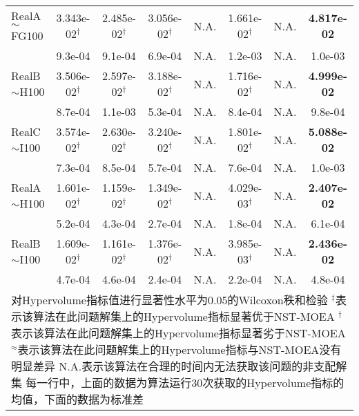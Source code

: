 {\begin{longtable}[c]{lccccccc}
    RealA$\sim$FG100      & 3.343e-02$^{\dag}$ & 2.485e-02$^{\dag}$ & 3.056e-02$^{\dag}$ & N.A.               & 1.661e-02$^{\dag}$ & N.A.                & \textbf{4.817e-02} \\
      & 9.3e-04            & 9.1e-04            & 6.9e-04            & N.A.               & 1.2e-03            & N.A.                          & 1.0e-03            \\
    \midrule
    RealB$\sim$H100      & 3.506e-02$^{\dag}$ & 2.597e-02$^{\dag}$ & 3.188e-02$^{\dag}$ & N.A.               & 1.716e-02$^{\dag}$ & N.A.                 & \textbf{4.999e-02} \\
            & 8.7e-04            & 1.1e-03            & 5.3e-04            & N.A.               & 8.4e-04            & N.A.                           & 9.8e-04            \\
    \midrule
    RealC$\sim$I100      & 3.574e-02$^{\dag}$ & 2.630e-02$^{\dag}$ & 3.240e-02$^{\dag}$ & N.A.               & 1.801e-02$^{\dag}$ & N.A.                & \textbf{5.088e-02} \\
             & 7.3e-04            & 8.5e-04            & 5.7e-04            & N.A.               & 7.6e-04            & N.A.                           & 1.0e-03            \\
    \midrule

    RealA$\sim$H100     & 1.601e-02$^{\dag}$ & 1.159e-02$^{\dag}$ & 1.349e-02$^{\dag}$ & N.A.               & 4.029e-03$^{\dag}$ & N.A.               & \textbf{2.407e-02} \\
           & 5.2e-04            & 4.3e-04            & 2.7e-04            & N.A.               & 1.8e-04            & N.A.                          & 6.1e-04            \\
    \midrule
    RealB$\sim$I100     & 1.609e-02$^{\dag}$ & 1.161e-02$^{\dag}$ & 1.376e-02$^{\dag}$ & N.A.               & 3.985e-03$^{\dag}$ & N.A.                 & \textbf{2.436e-02} \\
           & 4.7e-04            & 4.6e-04            & 2.4e-04            & N.A.               & 2.2e-04            & N.A.                      & 4.8e-04            \\
    \bottomrule
    \multicolumn{8}{p{45em}}{
        对Hypervolume指标值进行显著性水平为0.05的Wilcoxon秩和检验\vspace{-.7em}\newline{}
        $^\ddag$表示该算法在此问题解集上的Hypervolume指标显著优于NST-MOEA\vspace{-.7em}\newline{}
        $^\dag$表示该算法在此问题解集上的Hypervolume指标显著劣于NST-MOEA\vspace{-.7em}\newline{}
        $^\approx$表示该算法在此问题解集上的Hypervolume指标与NST-MOEA没有明显差异\vspace{-.7em}\newline{}
        N.A.表示该算法在合理的时间内无法获取该问题的非支配解集\vspace{-.7em}\newline{}
        每一行中，上面的数据为算法运行30次获取的Hypervolume指标的均值，下面的数据为标准差
        }
\end{longtable}
}%
